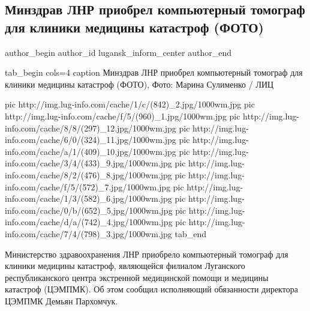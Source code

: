  
 
 
 
 
 
\subsection{Минздрав ЛНР приобрел компьютерный томограф для клиники медицины катастроф (ФОТО)}
\label{sec:04_12_2020.news.lnr.lug_info.lugansk_inform_center.1.tomograf}
\ifcmt
	author_begin
   author_id lugansk_inform_center
	author_end
\fi


\ifcmt
tab_begin cols=4
	caption Минздрав ЛНР приобрел компьютерный томограф для клиники медицины катастроф (ФОТО), Фото: Марина Сулименко / ЛИЦ

	pic http://img.lug-info.com/cache/1/c/(842)_2.jpg/1000wm.jpg
	pic http://img.lug-info.com/cache/f/5/(960)_1.jpg/1000wm.jpg
	pic http://img.lug-info.com/cache/8/8/(297)_12.jpg/1000wm.jpg
	pic http://img.lug-info.com/cache/6/0/(324)_11.jpg/1000wm.jpg
	pic http://img.lug-info.com/cache/a/1/(409)_10.jpg/1000wm.jpg
	pic http://img.lug-info.com/cache/3/4/(433)_9.jpg/1000wm.jpg
	pic http://img.lug-info.com/cache/8/2/(476)_8.jpg/1000wm.jpg
	pic http://img.lug-info.com/cache/f/5/(572)_7.jpg/1000wm.jpg
	pic http://img.lug-info.com/cache/1/3/(582)_6.jpg/1000wm.jpg
	pic http://img.lug-info.com/cache/0/b/(652)_5.jpg/1000wm.jpg
	pic http://img.lug-info.com/cache/d/a/(742)_4.jpg/1000wm.jpg
	pic http://img.lug-info.com/cache/7/4/(798)_3.jpg/1000wm.jpg
tab_end
\fi


Министерство здравоохранения ЛНР приобрело компьютерный томограф для клиники
медицины катастроф, являющейся филиалом Луганского республиканского центра
экстренной медицинской помощи и медицины катастроф (ЦЭМПМК). Об этом сообщил
исполняющий обязанности директора ЦЭМПМК Демьян Пархомчук.

